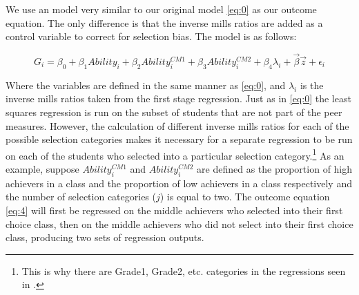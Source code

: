We use an model very similar to our original model \eqref{eq:0} as our outcome equation. 
The only difference is that the inverse mills ratios are added as a control variable to correct for selection bias. 
The model is as follows:

\begin{equation}\label{eq:4}
G_{i} = \beta_{0} + \beta_{1} Ability_{i} + \beta_{2} Ability_{i}^{CM1} + \beta_{3} Ability_{i}^{CM2} + \beta_{4} \lambda_{i} + \overrightarrow{\beta} \overrightarrow{z} + \epsilon_{i}
\end{equation}

Where the variables are defined in the same manner as \eqref{eq:0}, and $\lambda_{i}$ is the inverse mills ratios taken from the first stage regression.
Just as in \eqref{eq:0} the least squares regression is run on the subset of students that are not part of the peer measures. 
However, the calculation of different inverse mills ratios for each of the possible selection categories makes it necessary for a separate regression to be run on each of the students who selected into a particular selection category.\footnote{This is why there are Grade1, Grade2, etc. categories in the regressions seen in .}
As an example, suppose $Ability_{i}^{CM1}$ and $Ability_{i}^{CM2}$ are defined as the proportion of high achievers in a class and the proportion of low achievers in a class respectively and the number of selection categories ($j$) is equal to two. 
The outcome equation \eqref{eq:4} will first be regressed on the middle achievers who selected into their first choice class, then on the middle achievers who did not select into their first choice class, producing two sets of regression outputs. 